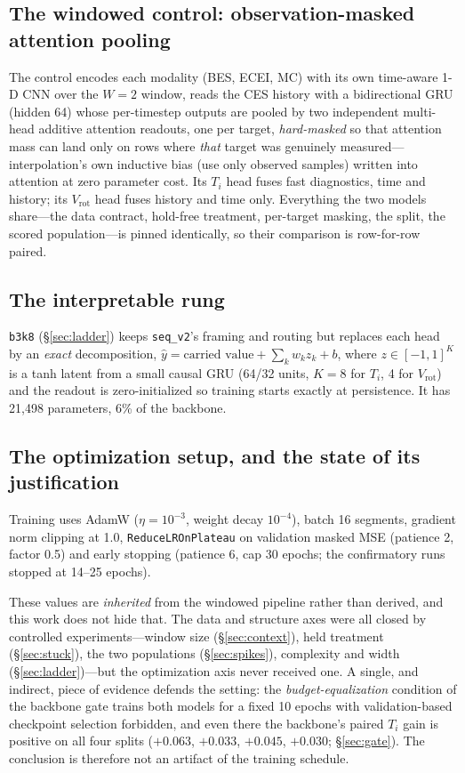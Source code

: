 \documentclass[10pt]{article}
\newcommand{\Ti}{\ensuremath{T_i}}
\newcommand{\Vrot}{\ensuremath{V_\mathrm{rot}}}
\newcommand{\seqv}{\texttt{seq\_v2}}
\newcommand{\bthree}{\texttt{b3k8}}
\begin{document}
\subsection{The windowed control: observation-masked attention pooling}
\label{sec:model:window}

The control encodes each modality (BES, ECEI, MC) with its own time-aware 1-D CNN
over the $W{=}2$ window, reads the CES history with a bidirectional GRU (hidden 64)
whose per-timestep outputs are pooled by two independent multi-head additive
attention readouts, one per target, \emph{hard-masked} so that attention mass can
land only on rows where \emph{that} target was genuinely measured---interpolation's
own inductive bias (use only observed samples) written into attention at zero
parameter cost. Its \Ti{} head fuses fast diagnostics, time and history; its
\Vrot{} head fuses history and time only. Everything the two models share---the
data contract, hold-free treatment, per-target masking, the split, the scored
population---is pinned identically, so their comparison is row-for-row paired.

\subsection{The interpretable rung}
\label{sec:model:rung}

\bthree{} (\S\ref{sec:ladder}) keeps \seqv{}'s framing and routing but replaces
each head by an \emph{exact} decomposition, $\hat y = \text{carried value} +
\sum_k w_k z_k + b$, where $z\in[-1,1]^K$ is a tanh latent from a small causal GRU
(64/32 units, $K{=}8$ for \Ti{}, 4 for \Vrot{}) and the readout is
zero-initialized so training starts exactly at persistence. It has 21{,}498
parameters, 6\% of the backbone.

\subsection{The optimization setup, and the state of its justification}
\label{sec:model:optim}

Training uses AdamW ($\eta=10^{-3}$, weight decay $10^{-4}$), batch 16 segments,
gradient norm clipping at 1.0, \texttt{ReduceLROnPlateau} on validation masked MSE
(patience 2, factor 0.5) and early stopping (patience 6, cap 30 epochs; the
confirmatory runs stopped at 14--25 epochs).

These values are \emph{inherited} from the windowed pipeline rather than derived, and
this work does not hide that. The data and structure axes were all closed by
controlled experiments---window size (\S\ref{sec:context}), held treatment
(\S\ref{sec:stuck}), the two populations (\S\ref{sec:spikes}), complexity and width
(\S\ref{sec:ladder})---but the optimization axis never received one. A single, and
indirect, piece of evidence defends the setting: the \emph{budget-equalization}
condition of the backbone gate trains both models for a fixed 10 epochs with
validation-based checkpoint selection forbidden, and even there the backbone's paired
\Ti{} gain is positive on all four splits ($+0.063$, $+0.033$, $+0.045$, $+0.030$;
\S\ref{sec:gate}). The conclusion is therefore not an artifact of the training
schedule.
\end{document}
